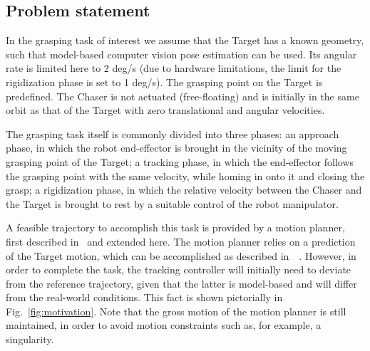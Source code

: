 \subsection{Problem statement}
%
In the grasping task of interest we assume that the Target has a known geometry, such that model-based computer vision pose estimation can be used. Its angular rate is limited here to 2 deg/s (due to hardware limitations, the limit for the rigidization phase is set to 1 deg/s). %
The grasping point on the Target is predefined. %
%
The Chaser is not actuated (free-floating) and is initially in the same orbit as that of the Target with zero translational and angular velocities.

The grasping task itself is commonly divided into three phases: an approach phase, in which the robot end-effector is brought in the vicinity of the moving grasping point of the Target; a tracking phase, in which the end-effector follows the grasping point with the same velocity, while homing in onto it and closing the grasp; a rigidization phase, in which the relative velocity between the Chaser and the Target is brought to rest by a suitable control of the robot manipulator. 

A feasible trajectory to accomplish this task is provided by a motion planner, first described in~\cite{lampariello2013generating} and extended here. The motion planner relies on a prediction of the Target motion, which can be accomplished as described in~\cite{hillenbrand2005motion}~\cite{aghili2012prediction}. However, in order to complete the task, the tracking controller will initially need to deviate from the reference trajectory, given that the latter is model-based and will differ from the real-world conditions. This fact is shown pictorially in Fig.~\ref{fig:motivation}. Note that the gross motion of the motion planner is still maintained, in order to avoid motion constraints such as, for example, a singularity. 

